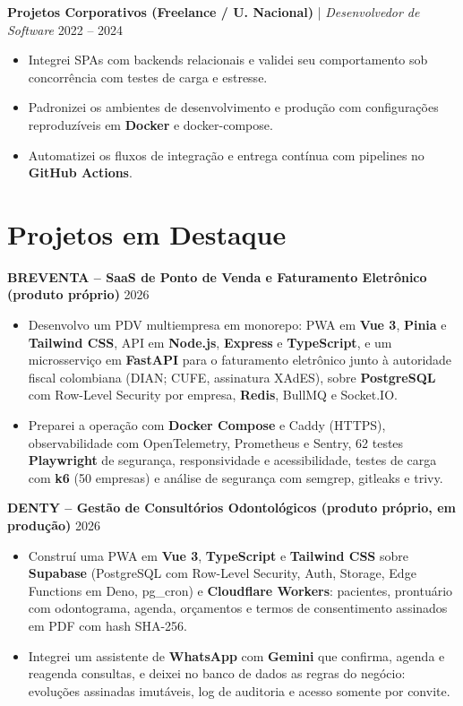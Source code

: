 \documentclass[11pt,a4paper]{article}
\begin{document}
\vspace{0.2cm}

\noindent
\textbf{Projetos Corporativos (Freelance / U. Nacional)} | \textit{Desenvolvedor de Software} \hfill 2022 – 2024
\begin{itemize}[leftmargin=*, noitemsep, topsep=2pt]
    \item Integrei SPAs com backends relacionais e validei seu comportamento sob concorrência com testes de carga e estresse.
    \item Padronizei os ambientes de desenvolvimento e produção com configurações reproduzíveis em \textbf{Docker} e docker-compose.
    \item Automatizei os fluxos de integração e entrega contínua com pipelines no \textbf{GitHub Actions}.
\end{itemize}

\section*{Projetos em Destaque}

\noindent
\textbf{BREVENTA – SaaS de Ponto de Venda e Faturamento Eletrônico (produto próprio)} \hfill 2026
\begin{itemize}[leftmargin=*, noitemsep, topsep=2pt]
    \item Desenvolvo um PDV multiempresa em monorepo: PWA em \textbf{Vue 3}, \textbf{Pinia} e \textbf{Tailwind CSS}, API em \textbf{Node.js}, \textbf{Express} e \textbf{TypeScript}, e um microsserviço em \textbf{FastAPI} para o faturamento eletrônico junto à autoridade fiscal colombiana (DIAN; CUFE, assinatura XAdES), sobre \textbf{PostgreSQL} com Row-Level Security por empresa, \textbf{Redis}, BullMQ e Socket.IO.
    \item Preparei a operação com \textbf{Docker Compose} e Caddy (HTTPS), observabilidade com OpenTelemetry, Prometheus e Sentry, 62 testes \textbf{Playwright} de segurança, responsividade e acessibilidade, testes de carga com \textbf{k6} (50 empresas) e análise de segurança com semgrep, gitleaks e trivy.
\end{itemize}

\vspace{0.2cm}

\noindent
\textbf{DENTY – Gestão de Consultórios Odontológicos (produto próprio, em produção)} \hfill 2026
\begin{itemize}[leftmargin=*, noitemsep, topsep=2pt]
    \item Construí uma PWA em \textbf{Vue 3}, \textbf{TypeScript} e \textbf{Tailwind CSS} sobre \textbf{Supabase} (PostgreSQL com Row-Level Security, Auth, Storage, Edge Functions em Deno, pg\_cron) e \textbf{Cloudflare Workers}: pacientes, prontuário com odontograma, agenda, orçamentos e termos de consentimento assinados em PDF com hash SHA-256.
    \item Integrei um assistente de \textbf{WhatsApp} com \textbf{Gemini} que confirma, agenda e reagenda consultas, e deixei no banco de dados as regras do negócio: evoluções assinadas imutáveis, log de auditoria e acesso somente por convite.
\end{itemize}
\end{document}
